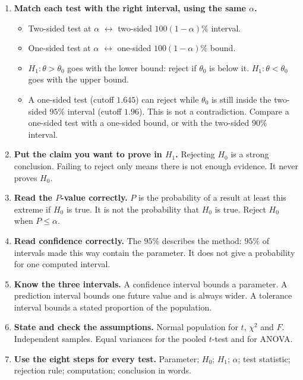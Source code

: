 \begin{enumerate}
\begin{itemize}
    \item \emph{Numerical check} (impact-energy data: $\bar{x}=64.46$, standard error $0.316$). Two-sided $95\%$: $(63.84,\,65.08)$. One-sided $95\%$: $\mu\le64.98$ or $\mu\ge63.94$. Two-sided $90\%$: $(63.94,\,64.98)$, which equals the two one-sided $95\%$ bounds. One-sided $97.5\%$ upper bound: $65.08$.
  \end{itemize}
  \item \textbf{Match each test with the right interval, using the same $\alpha$.}
  \begin{itemize}
    \item Two-sided test at $\alpha$ $\leftrightarrow$ two-sided $100(1-\alpha)\%$ interval.
    \item One-sided test at $\alpha$ $\leftrightarrow$ one-sided $100(1-\alpha)\%$ bound.
    \item $H_1:\theta>\theta_0$ goes with the lower bound: reject if $\theta_0$ is below it. $H_1:\theta<\theta_0$ goes with the upper bound.
    \item A one-sided test (cutoff $1.645$) can reject while $\theta_0$ is still inside the two-sided $95\%$ interval (cutoff $1.96$). This is not a contradiction. Compare a one-sided test with a one-sided bound, or with the two-sided $90\%$ interval.
  \end{itemize}
  \item \textbf{Put the claim you want to prove in $H_1$.} Rejecting $H_0$ is a strong conclusion. Failing to reject only means there is not enough evidence. It never proves $H_0$.
  \item \textbf{Read the $P$-value correctly.} $P$ is the probability of a result at least this extreme if $H_0$ is true. It is not the probability that $H_0$ is true. Reject $H_0$ when $P\le\alpha$.
  \item \textbf{Read confidence correctly.} The $95\%$ describes the method: $95\%$ of intervals made this way contain the parameter. It does not give a probability for one computed interval.
  \item \textbf{Know the three intervals.} A confidence interval bounds a parameter. A prediction interval bounds one future value and is always wider. A tolerance interval bounds a stated proportion of the population.
  \item \textbf{State and check the assumptions.} Normal population for $t$, $\chi^2$ and $F$. Independent samples. Equal variances for the pooled $t$-test and for ANOVA.
  \item \textbf{Use the eight steps for every test.} Parameter; $H_0$; $H_1$; $\alpha$; test statistic; rejection rule; computation; conclusion in words.
\end{enumerate}


